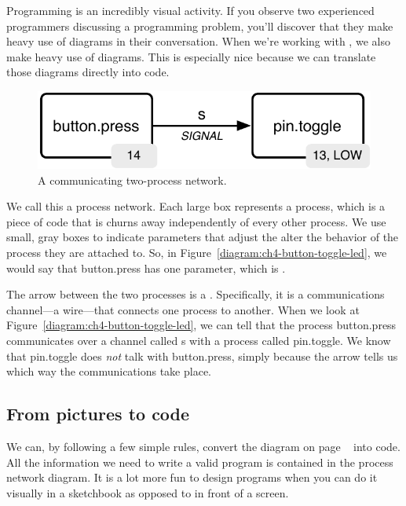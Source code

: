 Programming is an incredibly visual activity. If you observe two experienced programmers discussing a programming problem, you'll discover that they make heavy use of diagrams in their conversation. When we're working with \occam, we also make heavy use of diagrams. This is especially nice because we can translate those diagrams directly into code.


\begin{figure}[ht]
  \begin{center}
    \includegraphics[width=0.8\linewidth]{images/ch4-button-toggle-led}
    \caption{A communicating two-process network.}
    \label{diagram:ch4-button-toggle-led}
  \end{center}
\end{figure}

We call this a {\strong process network}. Each large box represents a {\strong process}, which is a piece of code that is churns away independently of every other process. We use small, gray boxes to indicate {\strong parameters} that adjust the alter the behavior of the process they are attached to. So, in Figure~\vref{diagram:ch4-button-toggle-led}, we would say that {\code button.press} has one parameter, which is {}. 

The arrow between the two processes is a \CHANnel. Specifically, it is a communications channel---a wire---that connects one process to another. When we look at Figure~\vref{diagram:ch4-button-toggle-led}, we can tell that the process {\code button.press} communicates over a channel called {\code s} with a process called {\code pin.toggle}. We know that {\code pin.toggle} does {\em not} talk with {\code button.press}, simply because the arrow tells us which way the communications take place.


\subsection{From pictures to code}
We can, by following a few simple rules, convert the diagram on page ~\pageref{diagram:ch4-button-toggle-led}\xspace into code. {\strong All the information we need to write a valid \occam program is contained in the process network diagram.} It is a lot more fun to design programs  when you can do it visually in a sketchbook as opposed to in front of a screen.


